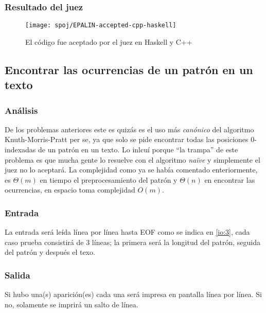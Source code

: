 \subsubsection{Resultado del juez}
\begin{figure}[H]
\centering
\texttt{[image: spoj/EPALIN-accepted-cpp-haskell]}
\caption{El código fue aceptado por el juez en Haskell y C++}
\end{figure}

\newpage


\subsection{Encontrar las ocurrencias de un patrón en un texto}

\subsubsection{Análisis}
De los problemas anteriores este es quizás es el uso más \textit{canónico} del algoritmo
Knuth-Morris-Pratt per se, ya que solo se pide encontrar todas las posiciones 0-indexadas de
un patrón en un texto. Lo inlcuí porque ``la trampa'' de este problema es que mucha gente lo
resuelve con el algoritmo \textit{naïve} y simplemente el juez no lo aceptará. La complejidad como
ya se había comentado enteriormente, es $\Theta(m)$ en tiempo el preprocesamiento del patrón y
$\Theta(n)$ en encontrar las ocurrencias, en espacio toma complejidad $O(m)$.

\subsubsection{Entrada}
La entrada será leída línea por línea hasta EOF como se indica en \ref{io:3}, cada caso prueba
consistirá de 3 líneas; la primera será la longitud del patrón, seguida del patrón y después
el texo.

\subsubsection{Salida}
Si hubo una(s) aparición(es) cada una será impresa en pantalla línea por línea. Si no, solamente
se imprirá un salto de línea.

